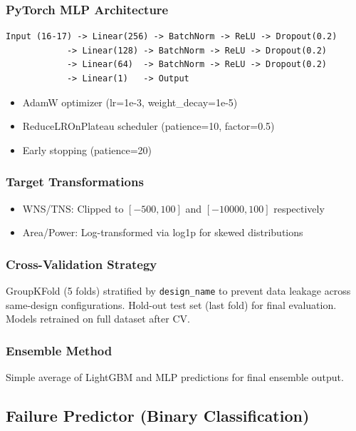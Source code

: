 \documentclass[10pt,conference]{IEEEtran}
\begin{document}
\subsubsection{PyTorch MLP Architecture}
\begin{verbatim}
Input (16-17) -> Linear(256) -> BatchNorm -> ReLU -> Dropout(0.2)
            -> Linear(128) -> BatchNorm -> ReLU -> Dropout(0.2)
            -> Linear(64)  -> BatchNorm -> ReLU -> Dropout(0.2)
            -> Linear(1)   -> Output
\end{verbatim}
\begin{itemize}
    \item AdamW optimizer (lr=1e-3, weight\_decay=1e-5)
    \item ReduceLROnPlateau scheduler (patience=10, factor=0.5)
    \item Early stopping (patience=20)
\end{itemize}

\subsubsection{Target Transformations}
\begin{itemize}
    \item WNS/TNS: Clipped to $[-500, 100]$ and $[-10000, 100]$ respectively
    \item Area/Power: Log-transformed via log1p for skewed distributions
\end{itemize}

\subsubsection{Cross-Validation Strategy}
GroupKFold (5 folds) stratified by \texttt{design\_name} to prevent data leakage across same-design configurations. Hold-out test set (last fold) for final evaluation. Models retrained on full dataset after CV.

\subsubsection{Ensemble Method}
Simple average of LightGBM and MLP predictions for final ensemble output.

\subsection{Failure Predictor (Binary Classification)}
\label{sec:failure_predictor}
\end{document}
